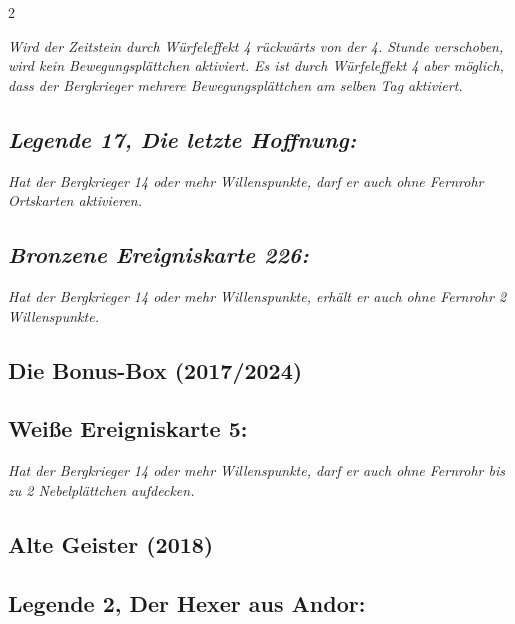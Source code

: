 \documentclass[10pt, a4paper, oneside]{book}
\newcommand{\fan}[1]{\textit{#1}}
\begin{document}
\begin{multicols*}{2}
\begin{bgcolor}
\fan{Wird der Zeitstein durch Würfeleffekt 4 rückwärts von der 4. Stunde verschoben, wird kein Bewegungsplättchen aktiviert. Es ist durch Würfeleffekt 4 aber möglich, dass der Bergkrieger mehrere Bewegungsplättchen am selben Tag aktiviert.}




\subsection{\fan{Legende 17, Die letzte Hoffnung:}}

\fan{Hat der Bergkrieger 14 oder mehr Willenspunkte, darf er auch ohne Fernrohr Ortskarten aktivieren.}


\subsection{\fan{Bronzene Ereigniskarte 226:}}

\fan{Hat der Bergkrieger 14 oder mehr Willenspunkte, erhält er auch ohne Fernrohr 2 Willenspunkte.}

\end{bgcolor}



\begin{bgcolor}[color-BB]

\section{Die Bonus-Box (2017/2024)}

\subsection{Weiße Ereigniskarte 5:}


\fan{Hat der Bergkrieger 14 oder mehr Willenspunkte, darf er auch ohne Fernrohr bis zu 2 Nebelplättchen aufdecken.}

\end{bgcolor}





\begin{bgcolor}[color-AG]
\section{Alte Geister (2018)}

\subsection{Legende 2, Der Hexer aus Andor:}


\end{bgcolor}
\end{multicols*}
\end{document}
